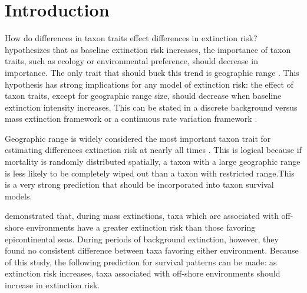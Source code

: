 \documentclass[12pt,letterpaper]{article}
\begin{document}
\section{Introduction}

How do differences in taxon traits effect differences in extinction risk? \citet{Jablonski1987} hypothesizes that as baseline extinction risk increases, the importance of taxon traits, such as ecology or environmental preference, should decrease in importance. The only trait that should buck this trend is geographic range \citep{Jablonski1987}. This hypothesis has strong implications for any model of extinction risk: the effect of taxon traits, except for geographic range size, should decrease when baseline extinction intensity increases. This can be stated in a discrete background versus mass extinction framework \citep{Jablonski1987} or a continuous rate variation framework \citep{Wang2003}.%

Geographic range is widely considered the most important taxon trait for estimating differences extinction risk at nearly all times \citep{Jablonski1986,Jablonski1987,Jablonski2003,Payne2007}. This is logical because if mortality is randomly distributed spatially, a taxon with a large geographic range is less likely to be completely wiped out than a taxon with restricted range.This is a very strong prediction that should be incorporated into taxon survival models.

\citet{Miller2009a} demonstrated that, during mass extinctions, taxa which are associated with off-shore environments have a greater extinction risk than those favoring epicontinental seas. During periods of background extinction, however, they found no consistent difference between taxa favoring either environment. Because of this study, the following prediction for survival patterns can be made: as extinction risk increases, taxa associated with off-shore environments should increase in extinction risk.


\end{document}
